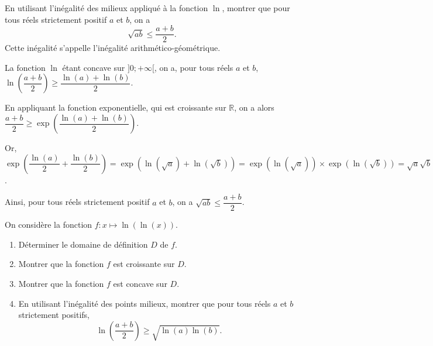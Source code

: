 \documentclass[11pt,fleqn, openany]{book} %
\begin{document}
\begin{exercise}En utilisant l'inégalité des milieux appliqué à la fonction $\ln$, montrer que pour tous réels strictement positif $a$ et $b$, on a
\[ \sqrt{ab} \leqslant \dfrac{a+b}{2}.\]
Cette inégalité s'appelle l'inégalité arithmético-géométrique.\end{exercise}

\begin{solution}La fonction $\ln$ étant concave sur $]0;+\infty[$, on a, pour tous réels $a$ et $b$, $\ln\left(\dfrac{a+b}{2}\right)\geqslant \dfrac{\ln(a)+\ln(b)}{2}$. 

En appliquant la fonction exponentielle, qui est croissante sur $\mathbb{R}$, on a alors $\dfrac{a+b}{2}\geqslant \exp \left(\dfrac{\ln(a)+\ln(b)}{2}\right)$.

Or, $\exp\left(\dfrac{\ln(a)}{2}+\dfrac{\ln(b)}{2}\right)=\exp(\ln(\sqrt{a})+\ln(\sqrt{b}))=\exp(\ln(\sqrt{a}))\times \exp(\ln(\sqrt{b})) = \sqrt{a}\sqrt{b}=\sqrt{ab}$.

Ainsi, pour tous réels strictement positif $a$ et $b$, on a $\sqrt{ab} \leqslant \dfrac{a+b}{2}$.
\end{solution}



\begin{exercise}On considère la fonction $f : x \mapsto \ln( \ln(x))$.
\begin{enumerate}
\item Déterminer le domaine de définition $D$ de $f$.
\item Montrer que la fonction $f$ est croissante sur $D$.
\item Montrer que la fonction $f$ est concave sur $D$.
\item En utilisant l'inégalité des points milieux, montrer que pour tous réels $a$ et $b$ strictement positifs,
\[ \ln \left( \dfrac{a+b}{2}\right) \geqslant \sqrt{\ln(a) \ln(b)}.\]
\end{enumerate}\end{exercise}
\end{document}
